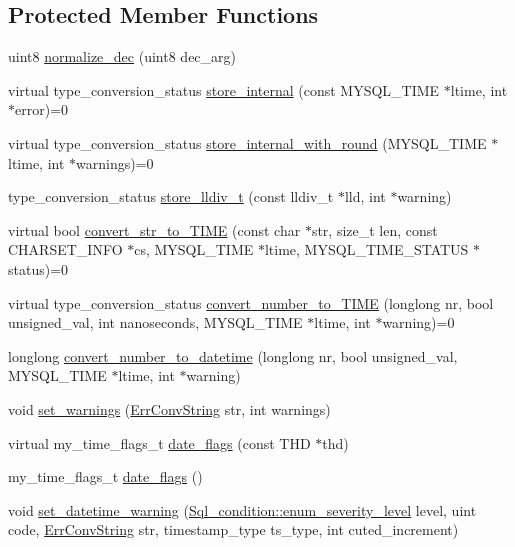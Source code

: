 \subsection*{Protected Member Functions}
\begin{DoxyCompactItemize}
\item 
uint8 \mbox{\hyperlink{classField__temporal_a59092c5657c6b4dee5043fe3b6009705}{normalize\+\_\+dec}} (uint8 dec\+\_\+arg)
\item 
virtual type\+\_\+conversion\+\_\+status \mbox{\hyperlink{classField__temporal_a21c90848108fc5d00bad242efce2b490}{store\+\_\+internal}} (const M\+Y\+S\+Q\+L\+\_\+\+T\+I\+ME $\ast$ltime, int $\ast$error)=0
\item 
virtual type\+\_\+conversion\+\_\+status \mbox{\hyperlink{classField__temporal_ae2be4bf490d06f2f1707bee19dcbebf4}{store\+\_\+internal\+\_\+with\+\_\+round}} (M\+Y\+S\+Q\+L\+\_\+\+T\+I\+ME $\ast$ltime, int $\ast$warnings)=0
\item 
type\+\_\+conversion\+\_\+status \mbox{\hyperlink{classField__temporal_afa855ca4829068ed563d0f8c187ed0f6}{store\+\_\+lldiv\+\_\+t}} (const lldiv\+\_\+t $\ast$lld, int $\ast$warning)
\item 
virtual bool \mbox{\hyperlink{classField__temporal_a69d31bd69ced4e4b918cf6c7dfba77f8}{convert\+\_\+str\+\_\+to\+\_\+\+T\+I\+ME}} (const char $\ast$str, size\+\_\+t len, const C\+H\+A\+R\+S\+E\+T\+\_\+\+I\+N\+FO $\ast$cs, M\+Y\+S\+Q\+L\+\_\+\+T\+I\+ME $\ast$ltime, M\+Y\+S\+Q\+L\+\_\+\+T\+I\+M\+E\+\_\+\+S\+T\+A\+T\+US $\ast$status)=0
\item 
virtual type\+\_\+conversion\+\_\+status \mbox{\hyperlink{classField__temporal_a08043a131a33951273dc348cbacd2858}{convert\+\_\+number\+\_\+to\+\_\+\+T\+I\+ME}} (longlong nr, bool unsigned\+\_\+val, int nanoseconds, M\+Y\+S\+Q\+L\+\_\+\+T\+I\+ME $\ast$ltime, int $\ast$warning)=0
\item 
longlong \mbox{\hyperlink{classField__temporal_a9f8fcf6b926588029301c793c7a84372}{convert\+\_\+number\+\_\+to\+\_\+datetime}} (longlong nr, bool unsigned\+\_\+val, M\+Y\+S\+Q\+L\+\_\+\+T\+I\+ME $\ast$ltime, int $\ast$warning)
\item 
void \mbox{\hyperlink{classField__temporal_acd0614abebce85c137fcc3d8e208c309}{set\+\_\+warnings}} (\mbox{\hyperlink{classErrConvString}{Err\+Conv\+String}} str, int warnings)
\item 
virtual my\+\_\+time\+\_\+flags\+\_\+t \mbox{\hyperlink{classField__temporal_ac97041d80803a32c6fb9250bfa0c9200}{date\+\_\+flags}} (const T\+HD $\ast$thd)
\item 
my\+\_\+time\+\_\+flags\+\_\+t \mbox{\hyperlink{classField__temporal_a4868bc52498bb520828db7db377c7efb}{date\+\_\+flags}} ()
\item 
void \mbox{\hyperlink{classField__temporal_a4f387c3d11932dc0e656ee8dc84f42e2}{set\+\_\+datetime\+\_\+warning}} (\mbox{\hyperlink{classSql__condition_ab0602581e19cddb609bfe10c44be4e83}{Sql\+\_\+condition\+::enum\+\_\+severity\+\_\+level}} level, uint code, \mbox{\hyperlink{classErrConvString}{Err\+Conv\+String}} str, timestamp\+\_\+type ts\+\_\+type, int cuted\+\_\+increment)
\end{DoxyCompactItemize}
